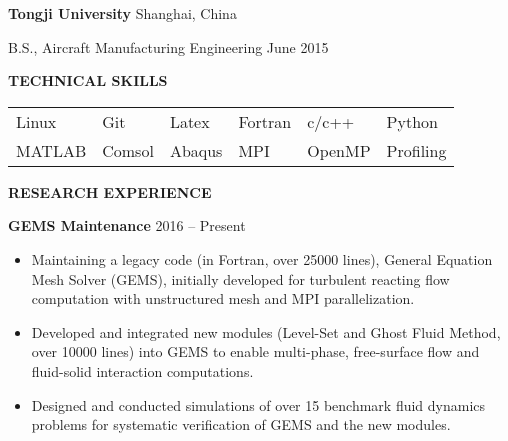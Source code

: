 \documentclass[11pt, letterpaper]{article}
\begin{document}
\textbf{Tongji University} 
\hfill
Shanghai, China

B.S., Aircraft Manufacturing Engineering \hfill June 2015

\vskip 9pt

% 
% 

\textbf{TECHNICAL SKILLS}

\fullrule

\begin{tabular}{@{} l l l l l l @{}}
   Linux & Git & Latex & Fortran & c/c++ & Python \\
   MATLAB & Comsol & Abaqus & MPI & OpenMP & Profiling
\end{tabular}

\vspace{9pt}

\textbf{RESEARCH EXPERIENCE}

\fullrule

\textbf{GEMS Maintenance} \hfill 2016 -- Present
\begin{itemize}[leftmargin=*, labelsep=5mm]
   \item Maintaining a legacy code (in Fortran, over 25000 lines), General Equation Mesh Solver
      (GEMS), initially developed for turbulent reacting flow computation with unstructured mesh and
      MPI parallelization.
   \item Developed and integrated new modules (Level-Set and Ghost Fluid Method, over 10000 lines)
      into GEMS to enable multi-phase, free-surface flow and fluid-solid interaction computations.
   \item Designed and conducted simulations of over 15 benchmark fluid dynamics
      problems for systematic verification of GEMS and the new modules.
\end{itemize}

\vspace{3pt}
\end{document}
